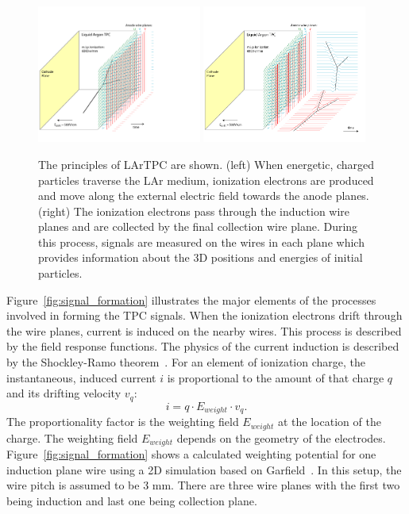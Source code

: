 \begin{figure}[htb]
\centering
\includegraphics[width=0.48\textwidth]{figures/TPC_1.png}
\includegraphics[width=0.48\textwidth]{figures/TPC_2.png}
\caption{The principles of LArTPC are shown. (left) When energetic, charged particles 
traverse the LAr medium, ionization electrons are produced and move
along the external electric field towards the anode planes. (right) The ionization
electrons pass through the induction wire planes and are  collected by the 
final collection wire plane. 
During this process, signals are measured on the wires
in each plane which provides information about the 3D positions and
energies of initial particles.}
\label{fig:signal}
\end{figure}

Figure~\ref{fig:signal_formation} illustrates the major elements of the  
processes involved in forming the TPC signals. 
When the ionization electrons drift through the wire planes, current is 
induced on the nearby wires. This process is described by the field response
functions. The physics of the current induction is described by the Shockley-Ramo 
theorem~\cite{Shockley,Ramo}.  For an element of ionization charge, 
the instantaneous, induced current $i$ is proportional to the amount of that
charge $q$ and its drifting velocity $v_q$:
\begin{equation}
i = q \cdot E_{weight} \cdot v_q.
\end{equation}
The proportionality factor is the weighting field $E_{weight}$ at the 
location of the charge. The weighting field $E_{weight}$ 
depends on the geometry of the electrodes. Figure~\ref{fig:signal_formation} shows a 
calculated weighting potential for one induction plane wire using a 2D simulation based 
on Garfield~\cite{garfield}. 
In this setup, the wire pitch is assumed to be 3 mm. There are three wire planes 
with the first two being induction and last one being collection plane. 


